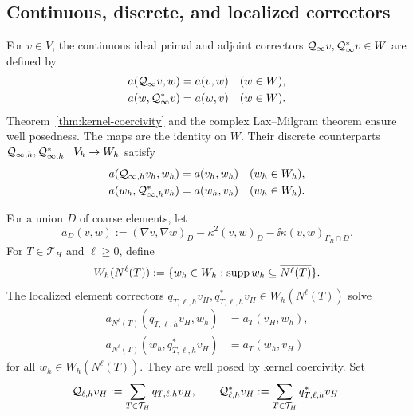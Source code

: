\subsection{Continuous, discrete, and localized correctors}
\label{sec:correctors}

For $v\in V$, the continuous ideal primal and adjoint correctors
$\mathcal Q_\infty v,\mathcal Q_\infty^* v\in W$ are defined by
\begin{align}
  a(\mathcal Q_\infty v,w)&=a(v,w) &&(w\in W),
  \label{eq:continuous-ideal-primal}\\
  a(w,\mathcal Q_\infty^* v)&=a(w,v) &&(w\in W).
  \label{eq:continuous-ideal-adjoint}
\end{align}
Theorem~\ref{thm:kernel-coercivity} and the complex Lax--Milgram theorem
ensure well posedness.  The maps are the identity on $W$.  Their discrete
counterparts $\mathcal Q_{\infty,h},\mathcal Q_{\infty,h}^*:V_h\to W_h$ satisfy
\begin{align}
  a(\mathcal Q_{\infty,h} v_h,w_h)&=a(v_h,w_h) &&(w_h\in W_h),
  \label{eq:discrete-ideal-primal}\\
  a(w_h,\mathcal Q_{\infty,h}^* v_h)&=a(w_h,v_h) &&(w_h\in W_h).
  \label{eq:discrete-ideal-adjoint}
\end{align}

For a union $D$ of coarse elements, let
\begin{equation}
\label{eq:local-form}
  a_D(v,w)
  :=(\nabla v,\nabla w)_D-\kappa^2(v,w)_D
    -\ii\kappa(v,w)_{\Gamma_R\cap\overline D}.
\end{equation}
For $T\in\mathcal T_H$ and $\ell\geq0$, define
\begin{equation}
\label{eq:local-kernel-corrector-space}
  W_h(N^\ell(T))
  :=\{w_h\in W_h:\operatorname{supp} w_h\subseteq\overline{N^\ell(T)}\}.
\end{equation}
The localized element correctors
$q_{T,\ell,h}v_H,q_{T,\ell,h}^*v_H\in W_h(N^\ell(T))$ solve
\begin{align}
  a_{N^\ell(T)}(q_{T,\ell,h}v_H,w_h)
  &=a_T(v_H,w_h),
  \label{eq:local-primal}\\
  a_{N^\ell(T)}(w_h,q_{T,\ell,h}^*v_H)
  &=a_T(w_h,v_H)
  \label{eq:local-adjoint}
\end{align}
for all $w_h\in W_h(N^\ell(T))$.  They are well posed by kernel
coercivity.  Set
\begin{equation}
\label{eq:assembled-local-correctors}
  \mathcal Q_{\ell,h} v_H:=\sum_{T\in\mathcal T_H}q_{T,\ell,h}v_H,
  \qquad
  \mathcal Q_{\ell,h}^* v_H:=\sum_{T\in\mathcal T_H}q_{T,\ell,h}^*v_H.
\end{equation}

